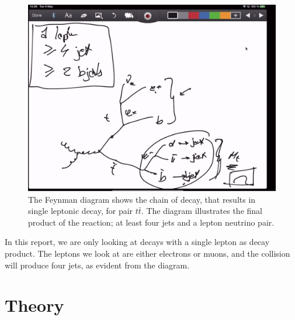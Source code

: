 \documentclass[12pt,a4paper]{article}
\numberwithin{equation}{section}
\begin{document}
\begin{figure}[H]
	\includegraphics[width=\linewidth]{figures/placeholder_feynman_singlelep.png}
	\caption{The Feynman diagram shows the chain of decay, that results in single
    leptonic decay, for pair $t\bar t$. The diagram illustrates the final
    product of the reaction; at least four jets and a lepton neutrino
    pair.}\label{fig:feynmandiagram}%
\end{figure}

In this report, we are only looking at decays with a single lepton as decay
product. The leptons we look at are either electrons or muons, and the collision
will produce four jets, as evident from the diagram.

\section{Theory}
\end{document}
